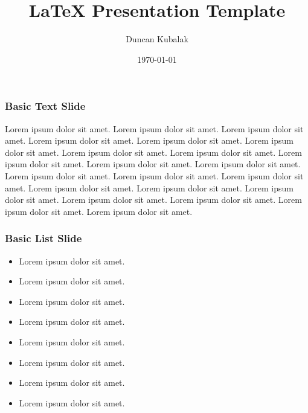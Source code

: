 \documentclass{beamer}
\title{LaTeX Presentation Template}
\author{Duncan Kubalak}
\date{\today}
\begin{document}
	\frame{\titlepage}
	
	\begin{frame}
		\frametitle{Basic Text Slide}
		Lorem ipsum dolor sit amet. Lorem ipsum dolor sit amet. Lorem ipsum dolor sit amet. Lorem ipsum dolor sit amet. Lorem ipsum dolor sit amet. Lorem ipsum dolor sit amet. Lorem ipsum dolor sit amet. Lorem ipsum dolor sit amet. Lorem ipsum dolor sit amet. Lorem ipsum dolor sit amet. Lorem ipsum dolor sit amet. Lorem ipsum dolor sit amet. Lorem ipsum dolor sit amet. Lorem ipsum dolor sit amet. Lorem ipsum dolor sit amet. Lorem ipsum dolor sit amet. Lorem ipsum dolor sit amet. Lorem ipsum dolor sit amet. Lorem ipsum dolor sit amet. Lorem ipsum dolor sit amet. Lorem ipsum dolor sit amet.
	\end{frame}

	\begin{frame}
		\frametitle{Basic List Slide}
		\begin{itemize}
			\item{Lorem ipsum dolor sit amet.}
			\item{Lorem ipsum dolor sit amet.}
			\item{Lorem ipsum dolor sit amet.}
			\item{Lorem ipsum dolor sit amet.}
			\item{Lorem ipsum dolor sit amet.}
			\item{Lorem ipsum dolor sit amet.}
			\item{Lorem ipsum dolor sit amet.}
			\item{Lorem ipsum dolor sit amet.}
		\end{itemize}
	\end{frame}
\end{document}
